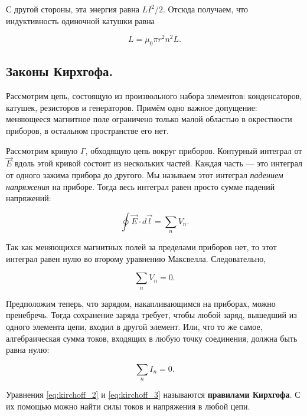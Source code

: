 \documentclass[11pt,a4paper]{article}
\numberwithin{equation}{section}
\begin{document}
С другой стороны, эта энергия равна $LI^2/2$. Отсюда получаем, что
индуктивность одиночной катушки равна

\begin{equation}
  \label{eq:inductivity}
  L = \mu_0 \pi r^2 n^2 L.
\end{equation}

\subsection{Законы Кирхгофа.}
\label{sec:kirchoff}

Рассмотрим цепь, состоящую из произвольного набора элементов:
конденсаторов, катушек, резисторов и генераторов. Примём одно важное
допущение: меняющееся магнитное поле ограничено только малой областью
в окрестности приборов, в остальном пространстве его нет.

Рассмотрим кривую $\Gamma$, обходящую цепь вокруг приборов. Контурный
интеграл от $\vec{E}$ вдоль этой кривой состоит из нескольких
частей. Каждая часть --- это интеграл от одного зажима прибора до
другого. Мы называем этот интеграл \textit{падением напряжения} на
приборе. Тогда весь интеграл равен просто сумме падений напряжений:

\begin{equation}
  \label{eq:kirchoff_1}
  \oint \vec{E} \cdot d \vec{l} = \sum_n V_n.
\end{equation}

Так как меняющихся магнитных полей за пределами приборов нет, то этот
интеграл равен нулю во второму уравнению Максвелла. Следовательно, 

\begin{equation}
  \label{eq:kirchoff_2}
  \sum_n V_n = 0. 
\end{equation}

Предположим теперь, что зарядом, накапливающимся на приборах, можно
пренебречь. Тогда сохранение заряда требует, чтобы любой заряд,
вышедший из одного элемента цепи, входил в другой элемент. Или, что то
же самое, алгебраическая сумма токов, входящих в любую точку
соединения, должна быть равна нулю:

\begin{equation}
  \label{eq:kirchoff_3}
  \sum_n I_n =0.
\end{equation}

Уравнения \eqref{eq:kirchoff_2} и \eqref{eq:kirchoff_3} называются
\textbf{правилами Кирхгофа}. С их помощью можно найти силы токов и
напряжения в любой цепи. 
\end{document}
